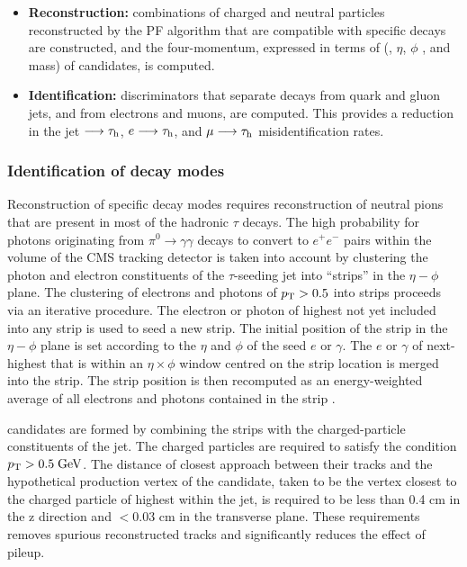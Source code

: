 \begin{itemize}
	\item \textbf{Reconstruction:} combinations of charged and neutral particles reconstructed by the PF algorithm that are compatible with specific \hadtau decays are constructed, and the four-momentum, expressed in terms of (\pt, \ensuremath{\eta}, \ensuremath{\phi} , and mass) of \hadtau candidates, is computed.
	
	\item \textbf{Identification:} discriminators that separate \hadtau decays from quark and gluon jets, and from electrons and muons, are computed. This provides a reduction in the jet \ensuremath{\longrightarrow \hadtau}, \ensuremath{e \longrightarrow \hadtau}, and \ensuremath{\mu \longrightarrow \hadtau} misidentification rates.
\end{itemize}

\subsubsection{Identification of decay modes}

Reconstruction of specific \hadtau decay modes requires reconstruction of neutral pions that are present in most of the hadronic \ensuremath{\tau} decays. The high probability for photons originating from \ensuremath{\pi^{0} \longrightarrow \gamma \gamma} decays to convert to \ensuremath{e^{+}e^{-}} pairs within the volume of the CMS tracking detector is taken into account by clustering the photon and electron constituents of the \ensuremath{\tau}-seeding jet into “strips” in the \ensuremath{\eta - \phi} plane. The clustering of electrons and photons of \ensuremath{\pt > 0.5} \gev into strips proceeds via an iterative procedure. The electron or photon of highest \pt not yet included into any strip is used to seed a new strip. The initial position of the strip in the \ensuremath{\eta - \phi} plane is set according to the \ensuremath{\eta} and \ensuremath{\phi} of the seed \ensuremath{e} or \ensuremath{\gamma}. The \ensuremath{e} or \ensuremath{\gamma} of next-highest \pt that is within an \ensuremath{\eta \times \phi} window centred on the strip location is merged into the strip. The strip position is then recomputed as an energy-weighted average of all electrons and photons contained in the strip \cite{Khachatryan:2015dfa}.

\hadtau candidates are formed by combining the strips with the charged-particle constituents of the jet. The charged particles are required to satisfy the condition \ensuremath{\pt > 0.5 \gev}. The distance of closest approach between their tracks and the hypothetical production vertex of the \hadtau candidate, taken to be the vertex closest to the charged particle of highest \pt within the jet, is required to be less than 0.4 cm in the z direction and \ensuremath{< 0.03} cm in the transverse plane. These requirements removes spurious reconstructed tracks and significantly reduces the effect of pileup.

